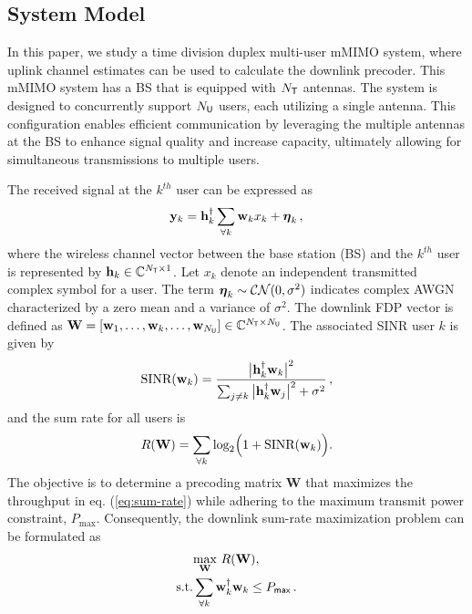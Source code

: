 \subsection{System Model}
In this paper, we study a time division duplex multi-user \gls{mMIMO} system, where uplink channel estimates can be used to calculate the downlink precoder. This \gls{mMIMO} system has a \gls{BS} that is equipped with $N_{\sf{T}}$ antennas. The system is designed to concurrently support $N_{\sf{U}}$ users, each utilizing a single antenna. This configuration enables efficient communication by leveraging the multiple antennas at the \gls{BS} to enhance signal quality and increase capacity, ultimately allowing for simultaneous transmissions to multiple users. 

The received signal at the $k^{th}$ user can be expressed as
\begin{equation}\label{eq:signal_recived}
    \mathbf{y}_k =  \mathbf{h}_{k}^{\dagger} \sum_{\forall k}  \mathbf{w}_{k} x_k + \boldsymbol{\eta}_k \, ,
\end{equation}
where the wireless channel vector between the base station (\gls{BS}) and the $k^{th}$ user is represented by $\mathbf{h}_{k} \in \mathbb{C}^{N_{\sf{T}} \times 1}$. Let $x_k$
denote an independent transmitted complex symbol for a user. The term $\boldsymbol{\eta}_k \sim \mathcal{CN}(0, \sigma^2)$ indicates complex \gls{AWGN} characterized by a zero mean and a variance of $\sigma^2$. The downlink \gls{FDP} vector is defined as $\mathbf{W} = \left[ \mathbf{w}_1, \ldots, \mathbf{w}_k, \ldots, \mathbf{w}_{N_{\sf{U}}} \right] \in \mathbb{C}^{N_{\sf{T}} \times N_{\sf{U}}}$.
The associated \gls{SINR} user $k$ is given by
\begin{equation}
    \text{SINR}(\mathbf{w}_{k}) = \frac{ \big|\mathbf{h}^{\dagger}_{k} \mathbf{w}_{k} \big|^2}{\sum_{j \neq k} \big|\mathbf{h}^{\dagger}_{k} \mathbf{w}_{j} \big|^2 + \sigma^2}\,,
\end{equation}
and the sum rate for all users is
\begin{equation}\label{eq:sum-rate}
    R(\mathbf{W}) = \sum_{\forall k}  \text{log}_2 \Bigl(  1+ \text{SINR}(\mathbf{w}_{k}) \Bigr).
\end{equation}
The objective is to determine a precoding matrix $\mathbf{W}$ that maximizes the throughput in eq. (\ref{eq:sum-rate}) while adhering to the maximum transmit power constraint, $P_{\text{max}}$. Consequently, the downlink sum-rate maximization problem can be formulated as
\begin{equation}\label{eq:maximization}
\begin{aligned}
    & \underset{\mathbf{W}}{\max}~ R(\mathbf{W}) , \\
    \text{s.t.}  &\sum_{\forall k} \mathbf{w}_{k}^{\dagger}  \mathbf{w}_{k} \leq P_{\sf{max}} \, .
\end{aligned}
\end{equation}

